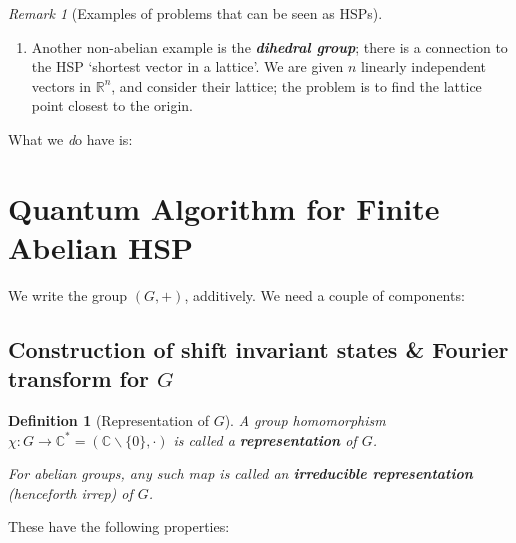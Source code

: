 \documentclass[]{article}
\theoremstyle{custhm}
\theoremstyle{cusdef}
\theoremstyle{custhm}
\theoremstyle{custhm}
\theoremstyle{custhm}
\theoremstyle{custhm}
\theoremstyle{cusdef}
\newtheorem*{defin*}{Definition}
\theoremstyle{remark}
\newtheorem*{remark*}{Remark}
\newcommand{\R}{\mathbb{R}}
\newcommand{\C}{\mathbb{C}}
\newcommand{\ra}{\rightarrow}
\newcommand{\undf}[1]{\textit{\textbf{#1}}}
\renewcommand{\it}[1]{\textit{#1}}
\newcommand{\poly}{\textrm{poly}}
\begin{document}
\begin{remark*}[Examples of problems that can be seen as HSPs]
\begin{enumerate}[label = (\alph*)]
	We currently do not believe that even quantum algorithms are able to solve NP-complete problems efficiently, so it is in some sense hopeless to try and work on these problems even from a quantum perspective. However, they can do NP-incomplete problems, so factoring and GI \it{etc}... are good candidates to attempt.
	
	Laslo Babai (2017) found a \it{quasi}-polynomial time \it{classical} algorithm for GI; it has runtime $n^{O((\log n)^2)}$. This is slower than polynomial time, but faster than exponential time. We have the following hierarchy:
	
	\begin{align*}
		\poly (n) < n^{O((\log n)^2)} < \textrm{exp}\\
		2^{O(\log n)} < 2^O((\log n)^3) < 2^{O(n)}
	\end{align*}
So in terms of exponents, these are linear/polynomial/exponential in $\log n$.
\item Another non-abelian example is the \undf{dihedral group}; there is a connection to the HSP `shortest vector in a lattice'. We are given $n$ linearly independent vectors in $\R^n$, and consider their lattice; the problem is to find the lattice point closest to the origin.
\end{enumerate}
\end{remark*}

What we {\it do} have is:

\section*{Quantum Algorithm for Finite Abelian HSP}

We write the group $(G,+)$, additively. We need a couple of components:

\subsection*{Construction of shift invariant states \& Fourier transform for $G$}
\begin{defin*}[Representation of $G$]
A group homomorphism $\chi :G\ra\C^\ast = (\C\backslash\{0\},\cdot)$ is called a \undf{representation} of $G$.

For abelian groups, any such map is called an \undf{irreducible representation} (henceforth {\it irrep}) of $G$.
\end{defin*}

These have the following properties:
\end{document}
